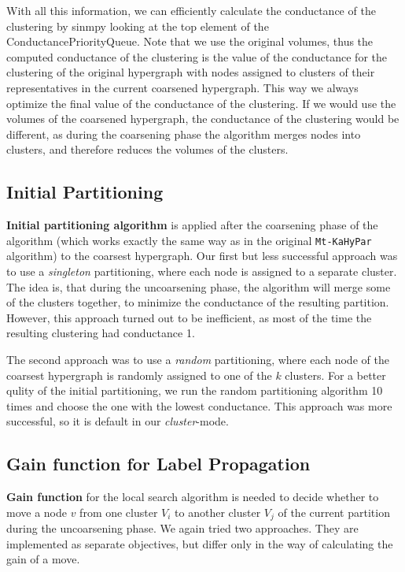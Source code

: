 \documentclass[acmsmall,nonacm,screen,review]{acmart}
\begin{document}
\smallbreak
With all this information, we can efficiently calculate the conductance of the
clustering by sinmpy looking at the top element of the ConductancePriorityQueue.
Note that we use the original volumes, thus the computed conductance of the
clustering is the value of the conductance for the clustering of the original 
hypergraph with nodes assigned to clusters of their representatives in the 
current coarsened hypergraph. This way we always optimize the final value 
of the conductance of the clustering. If we would use the volumes of the
coarsened hypergraph, the conductance of the clustering would be different, 
as during the coarsening phase the algorithm merges nodes into clusters, and
therefore reduces the volumes of the clusters.

\subsection{Initial Partitioning}
\textbf{Initial partitioning algorithm} is applied 
after the coarsening phase of the algorithm (which works exactly
the same way as in the original \texttt{Mt-KaHyPar} algorithm) to
the coarsest hypergraph. Our first but less successful approach was
to use a \textit{singleton} partitioning, where each node is assigned
to a separate cluster. The idea is, that during the uncoarsening phase,
the algorithm will merge some of the clusters together, to minimize the
conductance of the resulting partition. However, this approach
turned out to be inefficient, as most of the time the resulting
clustering had conductance 1.

The second approach was to use a \textit{random} partitioning, where
each node of the coarsest hypergraph is randomly assigned to one of the 
$k$ clusters. For a better qulity of the initial partitioning, we run
the random partitioning algorithm 10 times and choose the one with the
lowest conductance. This approach was more successful, so it is default 
in our \textit{cluster}-mode.

\subsection{Gain function for Label Propagation}
\noindent\textbf{Gain function} for the local search algorithm is needed
to decide whether to move a node $v$ from one cluster $V_i$ to
another cluster $V_j$ of the current partition during the uncoarsening
phase. We again tried two approaches. They are implemented as separate 
objectives, but differ only in the way of calculating the gain of a move.
\end{document}
